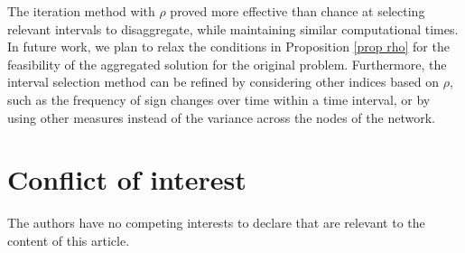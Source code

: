 \documentclass[smallextended,natbib]{svjour3}       %
\numberwithin{definition}{section}
\numberwithin{theorem}{section}
\numberwithin{proposition}{section}
\begin{document}
The iteration method with $\rho$ proved more effective than chance at selecting relevant intervals to disaggregate, while maintaining similar computational times.
In future work, we plan to relax the conditions in Proposition \ref{prop rho} for the feasibility of the aggregated solution for the original problem. Furthermore, the interval selection method can be refined by considering other indices based on \(\rho\), such as the frequency of sign changes over time within a time interval, or by using other measures instead of the variance across the nodes of the network.









\color{black}




%
 \section*{Conflict of interest}
The authors have no competing interests to declare that are relevant to the content of this article.
%









\end{document}
